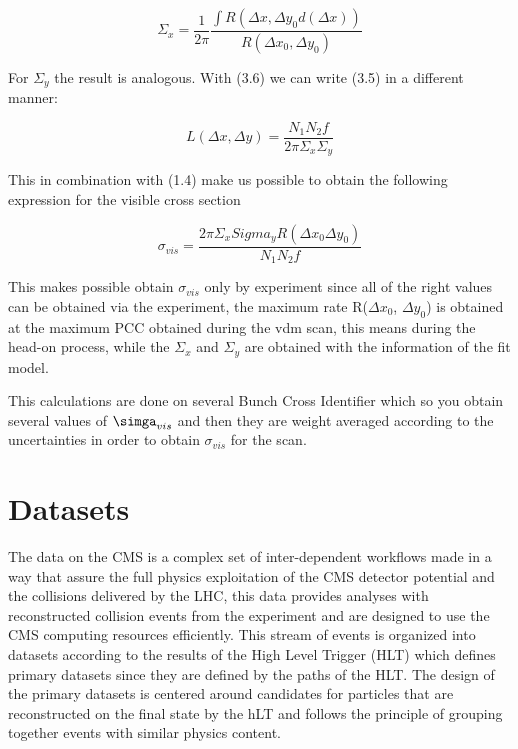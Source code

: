 \begin{equation}
\Sigma_{x} = \frac{1}{2 \pi} \frac{\int R(\Delta x, \Delta y_{0} d(\Delta x) )}{R(\Delta x_{0}, \Delta y_{0})}
\end{equation}

For $\Sigma_{y}$ the result is analogous. With (3.6) we can write (3.5) in a different manner:

\begin{equation}
L(\Delta x, \Delta y) = \frac{N_{1}N_{2}f}{2 \pi \Sigma_{x} \Sigma_{y}}
\end{equation}  

This in combination with (1.4) make us possible to obtain the following expression for the visible cross section

\begin{equation}
\sigma_{vis} = \frac{2 \pi \Sigma_{x} Sigma_{y} R(\Delta x_{0} \Delta y_{0})}{N_{1} N_{2}f}
\end{equation}

This makes possible obtain $\sigma_{vis}$ only by experiment since all of the right values can be obtained via the experiment, the maximum rate R($\Delta x_{0}$, $\Delta y_{0}$) is obtained at the maximum PCC obtained during the vdm scan, this means during the head-on process, while the $\Sigma_{x}$ and $\Sigma_{y}$ are obtained with the information of the fit model. 

This calculations are done on several Bunch Cross Identifier which so you obtain several values of $\simga_{vis}$ and then they are weight averaged according to the uncertainties in order to obtain $\sigma_{vis}$ for the scan. 

\section{Datasets}

The data on the CMS is a complex set of inter-dependent workflows made in a way that assure the full physics exploitation of the CMS detector potential and the collisions delivered by the LHC, this data provides analyses with reconstructed collision events from the experiment and are designed to use the CMS computing resources efficiently. This stream of events is organized into datasets according to the results of the High Level Trigger (HLT) which defines primary datasets since they are defined by the paths of the HLT. The design of the primary datasets is centered around candidates for particles that are reconstructed on the final state by the hLT and follows the principle of grouping together events with similar physics content.    \cite{datasets1}

